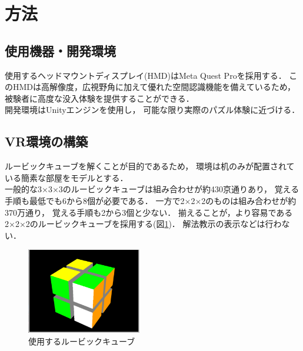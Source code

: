 \newpage
\section{方法}
  \subsection{使用機器・開発環境}
    使用するヘッドマウントディスプレイ(HMD)はMeta Quest Proを採用する．
    このHMDは高解像度，広視野角に加えて優れた空間認識機能を備えているため，
    被験者に高度な没入体験を提供することができる．
    \\\indent
    開発環境はUnityエンジンを使用し，
    可能な限り実際のパズル体験に近づける．
    \\\indent

  \subsection{VR環境の構築}
    ルービックキューブを解くことが目的であるため，
    環境は机のみが配置されている簡素な部屋をモデルとする．
    \\\indent
    一般的な3×3×3のルービックキューブは組み合わせが約430京通りあり，
    覚える手順も最低でも6から8個が必要である．
    一方で2×2×2のものは組み合わせが約370万通り，
    覚える手順も2から3個と少ない．
    揃えることが，より容易である
    2×2×2のルービックキューブを採用する(図\ref{cube})．
    解法教示の表示などは行わない．
    \begin{figure}[h]
      \begin{center}
        \includegraphics[width=50mm]{./images/cube.png}
        \caption{使用するルービックキューブ}\label{cube}
      \end{center}
    \end{figure}
